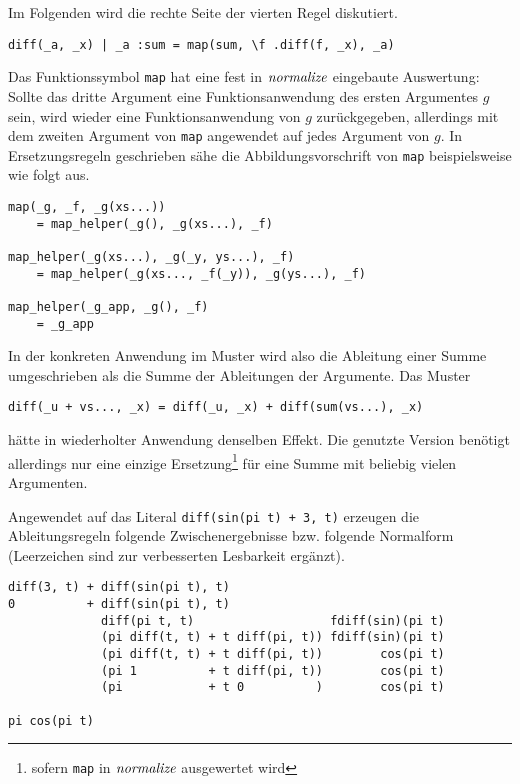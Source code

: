 Im Folgenden wird die rechte Seite der vierten Regel diskutiert.
\begin{verbatim}
diff(_a, _x) | _a :sum = map(sum, \f .diff(f, _x), _a)
\end{verbatim}
Das Funktionssymbol \verb|map| hat eine fest in $\mathit{normalize}$ eingebaute Auswertung: Sollte das dritte Argument eine Funktionsanwendung des ersten Argumentes $g$ sein, wird wieder eine Funktionsanwendung von $g$ zurückgegeben, allerdings mit dem zweiten Argument von \verb|map| angewendet auf jedes Argument von $g$. In Ersetzungsregeln geschrieben sähe die Abbildungsvorschrift von \verb|map| beispielsweise wie folgt aus.
\begin{unbreakable}\begin{verbatim}
map(_g, _f, _g(xs...)) 
    = map_helper(_g(), _g(xs...), _f)

map_helper(_g(xs...), _g(_y, ys...), _f) 
    = map_helper(_g(xs..., _f(_y)), _g(ys...), _f)

map_helper(_g_app, _g(), _f) 
    = _g_app
\end{verbatim}\end{unbreakable}

In der konkreten Anwendung im Muster wird also die Ableitung einer Summe umgeschrieben als die Summe der Ableitungen der Argumente. Das Muster
\begin{verbatim}
diff(_u + vs..., _x) = diff(_u, _x) + diff(sum(vs...), _x)
\end{verbatim}
hätte in wiederholter Anwendung denselben Effekt. Die genutzte Version benötigt allerdings nur eine einzige Ersetzung\footnote{sofern \texttt{map} in $\mathit{normalize}$ ausgewertet wird} für eine Summe mit beliebig vielen Argumenten.

\begin{beispiel}
Angewendet auf das Literal \verb|diff(sin(pi t) + 3, t)| erzeugen die Ableitungsregeln folgende Zwischenergebnisse bzw. folgende Normalform (Leerzeichen sind zur verbesserten Lesbarkeit ergänzt).
\begin{unbreakable}\begin{verbatim}
diff(3, t) + diff(sin(pi t), t)
0          + diff(sin(pi t), t)
             diff(pi t, t)                   fdiff(sin)(pi t)
             (pi diff(t, t) + t diff(pi, t)) fdiff(sin)(pi t)
             (pi diff(t, t) + t diff(pi, t))        cos(pi t)
             (pi 1          + t diff(pi, t))        cos(pi t)
             (pi            + t 0          )        cos(pi t)
             
pi cos(pi t)
\end{verbatim}\end{unbreakable}
\end{beispiel}

